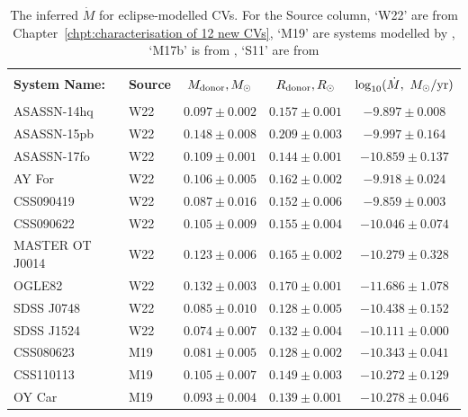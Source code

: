 \begin{table}
    \centering
    \caption{The inferred $\dot M$ for eclipse-modelled CVs. For the Source column, `W22' are from Chapter~\ref{chpt:characterisation of 12 new CVs}, `M19' are systems modelled by \citet{McAllister2019}, `M17b' is from \citet{mcallister2017b}, `S11' are from \citet{Savoury2011}}
    \label{table:results:mdot modelling}
    \begin{tabular}{llccc}
        \hline \\
        {\bf System Name:} & \textbf{Source} & \textbf{$M_{\rm donor}, M_\odot$}  & \textbf{$R_{\rm donor}, R_\odot$}  & \textbf{$\log_{10}(\dot M,\ M_\odot / {\rm yr})$} \\
        \hline \hline \\
        ASASSN-14hq         &  W22      & $0.097 \pm 0.002$ & $0.157 \pm 0.001$ & $ -9.897 \pm 0.008$ \\
        ASASSN-15pb         &  W22      & $0.148 \pm 0.008$ & $0.209 \pm 0.003$ & $ -9.997 \pm 0.164$ \\
        ASASSN-17fo         &  W22      & $0.109 \pm 0.001$ & $0.144 \pm 0.001$ & $-10.859 \pm 0.137$ \\
        AY For              &  W22      & $0.106 \pm 0.005$ & $0.162 \pm 0.002$ & $ -9.918 \pm 0.024$ \\
        CSS090419           &  W22      & $0.087 \pm 0.016$ & $0.152 \pm 0.006$ & $ -9.859 \pm 0.003$ \\
        CSS090622           &  W22      & $0.105 \pm 0.009$ & $0.155 \pm 0.004$ & $-10.046 \pm 0.074$ \\
        MASTER OT J0014     &  W22      & $0.123 \pm 0.006$ & $0.165 \pm 0.002$ & $-10.279 \pm 0.328$ \\
        OGLE82              &  W22      & $0.132 \pm 0.003$ & $0.170 \pm 0.001$ & $-11.686 \pm 1.078$ \\
        SDSS J0748          &  W22      & $0.085 \pm 0.010$ & $0.128 \pm 0.005$ & $-10.438 \pm 0.152$ \\
        SDSS J1524          &  W22      & $0.074 \pm 0.007$ & $0.132 \pm 0.004$ & $-10.111 \pm 0.000$ \\
        CSS080623           &  M19      & $0.081 \pm 0.005$ & $0.128 \pm 0.002$ & $-10.343 \pm 0.041$ \\
        CSS110113           &  M19      & $0.105 \pm 0.007$ & $0.149 \pm 0.003$ & $-10.272 \pm 0.129$ \\
        OY Car              &  M19      & $0.093 \pm 0.004$ & $0.139 \pm 0.001$ & $-10.278 \pm 0.046$ \\

\end{tabular}
\end{table}
